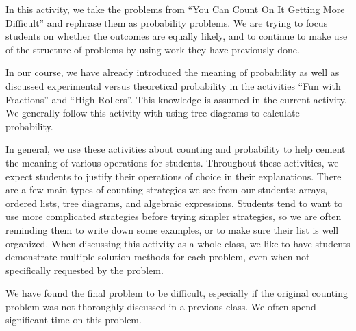 \documentclass{ximera}
\begin{document}
\newpage
\begin{instructorNotes}
In this activity, we take the problems from ``You Can Count On It Getting More Difficult'' and rephrase them as probability problems.  We are trying to focus students on whether the outcomes are equally likely, and to continue to make use of the structure of problems by using work they have previously done.

In our course, we have already introduced the meaning of probability as well as discussed experimental versus theoretical probability in the activities ``Fun with Fractions'' and ``High Rollers''.  This knowledge is assumed in the current activity.  We generally follow this activity with using tree diagrams to calculate probability.

In general, we use these activities about counting and probability to help cement the meaning of various operations for students.  Throughout these activities, we expect students to justify their operations of choice in their explanations.  There are a few main types of counting strategies we see from our students: arrays, ordered lists, tree diagrams, and algebraic expressions.  Students tend to want to use more complicated strategies before trying simpler strategies, so we are often reminding them to write down some examples, or to make sure their list is well organized. When discussing this activity as a whole class, we like to have students demonstrate multiple solution methods for each problem, even when not specifically requested by the problem.  

We have found the final problem to be difficult, especially if the original counting problem was not thoroughly discussed in a previous class.  We often spend significant time on this problem.

\end{instructorNotes}
\end{document}
